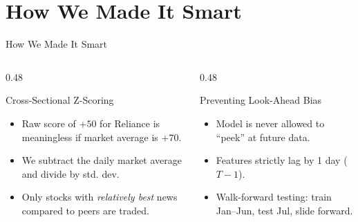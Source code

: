 \documentclass[aspectratio=169, 10pt]{beamer}
\begin{document}
\section{How We Made It Smart}
\begin{frame}{How We Made It Smart}
    \begin{columns}[T]
        \begin{column}{0.48\textwidth}
            \begin{block}{Cross-Sectional Z-Scoring}
                \begin{itemize}
                    \item Raw score of $+50$ for Reliance is meaningless if market average is $+70$.
                    \item We subtract the daily market average and divide by std. dev.
                    \item Only stocks with \textit{relatively best} news compared to peers are traded.
                \end{itemize}
            \end{block}
        \end{column}
        \begin{column}{0.48\textwidth}
            \begin{block}{Preventing Look-Ahead Bias}
                \begin{itemize}
                    \item Model is never allowed to ``peek'' at future data.
                    \item Features strictly lag by 1 day ($T-1$).
                    \item Walk-forward testing: train Jan--Jun, test Jul, slide forward.
                \end{itemize}
            \end{block}
        \end{column}
    \end{columns}
\end{frame}

\end{document}
